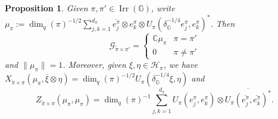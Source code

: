\documentclass[reqno]{amsart}
\numberwithin{equation}{section}
\newtheorem{Prop}[Theorem]{Proposition}
\DeclareMathOperator{\Irr}{\mathrm{Irr}}
\newcommand{\mcG}{\mathcal{G}}
\newcommand{\mcH}{\mathcal{H}}
\newcommand{\C}{\mathbb{C}}
\newcommand{\G}{\mathbb{G}}
\begin{document}
\begin{Prop}\label{spectraldata}
    Given $\pi, \pi'\in \Irr(\G)$, write $\mu_\pi:= \dim_q(\pi)^{-1/2}\sum_{j,k=1}^{d_\pi} \overline{e_j^\pi}\otimes e_k^\pi\otimes U_\pi(\delta_\G^{-1/4}e_j^\pi, e_k^\pi)^*$. Then
    $$\mcG_{\tilde{\pi}\times \pi'}= \begin{cases}
        \C \mu_\pi & \pi = \pi'\\
        0 & \pi\ne \pi'
    \end{cases}$$
    and $\|\mu_\pi\|=1$. Moreover, given $\xi, \eta \in \mcH_{\pi}$, we have $X_{\tilde{\pi}\times \pi}(\mu_\pi, \overline{\xi}\otimes \eta)= \dim_q(\pi)^{-1/2} U_\pi(\delta_\G^{-1/4}\xi, \eta)$ and $$Z_{\tilde{\pi}\times \pi}(\mu_\pi, \mu_\pi)= \dim_q(\pi)^{-1} \sum_{j,k=1}^{d_\pi} U_\pi(e_j^\pi, e_k^\pi)\otimes \overline{U_{\bar{\pi}}(\overline{e_j^\pi}, \overline{e_k^\pi})^*}.$$
    \end{Prop}
\end{document}
